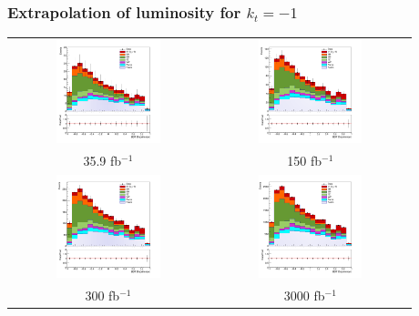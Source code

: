 \documentclass[11pt]{beamer}
\begin{document}
{\nologo
	\begin{frame}
	\frametitle{Extrapolation of luminosity for $k_t=-1$}
	\begin{center}
		\begin{tabular}{cc}
			\includegraphics[width=5.5cm,height=3cm]{figures/simple-kt-1.png} &
			\includegraphics[width=5.5cm,height=3cm]{figures/kt-1/150fb/simple-150-kt-1.png}\\ 
			\scriptsize{35.9 fb$^{-1}$} & \scriptsize{150 fb$^{-1}$} \\
			\includegraphics[width=5.5cm,height=3cm]{figures/kt-1/300fb/simple-300-kt-1.png}&
			\includegraphics[width=5.5cm,height=3cm]{figures/kt-1/3000fb/simple-3000-kt-1.png}\\
			\scriptsize{300 fb$^{-1}$} & \scriptsize{3000 fb$^{-1}$} \\
		\end{tabular}
	\end{center}
\end{frame}
}
\end{document}
